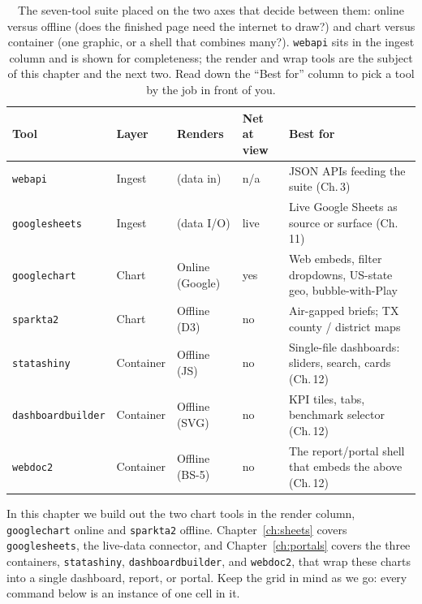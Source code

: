 \begin{table}[htbp]
\centering
\caption[The visualization suite at a glance]{The seven-tool suite placed on the two axes that decide between them: online versus offline (does the finished page need the internet to draw?) and chart versus container (one graphic, or a shell that combines many?). \texttt{webapi} sits in the ingest column and is shown for completeness; the render and wrap tools are the subject of this chapter and the next two. Read down the \enquote{Best for} column to pick a tool by the job in front of you.}
\label{tab:suite-matrix}
{\footnotesize
\setlength{\tabcolsep}{4pt}
\begin{tabular}{lllll}
\hline
Tool & Layer & Renders & Net at view & Best for \\
\hline
\texttt{webapi}      & Ingest    & (data in)      & n/a  & JSON APIs feeding the suite (Ch.\,3) \\
\texttt{googlesheets}& Ingest    & (data I/O)     & live & Live Google Sheets as source or surface (Ch.\,11) \\
\texttt{googlechart} & Chart     & Online (Google)& yes  & Web embeds, filter dropdowns, US-state geo, bubble-with-Play \\
\texttt{sparkta2}    & Chart     & Offline (D3)   & no   & Air-gapped briefs; TX county / district maps \\
\texttt{statashiny}  & Container & Offline (JS)   & no   & Single-file dashboards: sliders, search, cards (Ch.\,12) \\
\texttt{dashboardbuilder} & Container & Offline (SVG) & no & KPI tiles, tabs, benchmark selector (Ch.\,12) \\
\texttt{webdoc2}     & Container & Offline (BS-5) & no   & The report/portal shell that embeds the above (Ch.\,12) \\
\hline
\end{tabular}
}
\end{table}

In this chapter we build out the two chart tools in the render column, \texttt{googlechart} online and \texttt{sparkta2} offline. Chapter~\ref{ch:sheets} covers \texttt{googlesheets}, the live-data connector, and Chapter~\ref{ch:portals} covers the three containers, \texttt{statashiny}, \texttt{dashboardbuilder}, and \texttt{webdoc2}, that wrap these charts into a single dashboard, report, or portal. Keep the grid in mind as we go: every command below is an instance of one cell in it.

